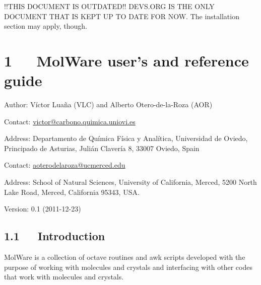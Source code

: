 \documentclass[a4paper]{article}
\newenvironment{DUfieldlist}%
    {\quote\description}
    {\enddescription\endquote}
\begin{document}
!!THIS DOCUMENT IS OUTDATED!!
DEVS.ORG IS THE ONLY DOCUMENT THAT IS KEPT UP TO DATE FOR NOW.
The installation section may apply, though.


\section{1~~~MolWare user's and reference guide%
  \label{molware-user-s-and-reference-guide}%
}
%
\begin{DUfieldlist}
\item[{Author:}]
Víctor Luaña (VLC) and Alberto Otero-de-la-Roza (AOR)

\item[{Contact:}]
\href{mailto:victor@carbono.quimica.uniovi.es}{victor@carbono.quimica.uniovi.es}

\item[{Address:}]
Departamento de Química Física y Analítica, Universidad de Oviedo,
Principado de Asturias,
Julián Clavería 8, 33007 Oviedo, Spain

\item[{Contact:}]
\href{mailto:aoterodelaroza@gmail.com}{aoterodelaroza@ucmerced.edu}

\item[{Address:}]
School of Natural Sciences,
University of California, Merced, 5200 North Lake Road, Merced,
California 95343, USA.

\item[{Version:}]
0.1 (2011-12-23)

\end{DUfieldlist}

\thispagestyle{empty}
\enlargethispage{+1\baselineskip}

\noindent{}

\clearpage

\label{contents}
\tableofcontents


\clearpage


\subsection{1.1~~~Introduction%
  \label{introduction}%
}

MolWare is a collection of octave routines and awk scripts developed with
the purpose of working with molecules and crystals and interfacing with
other codes that work with molecules and crystals.
\end{document}
